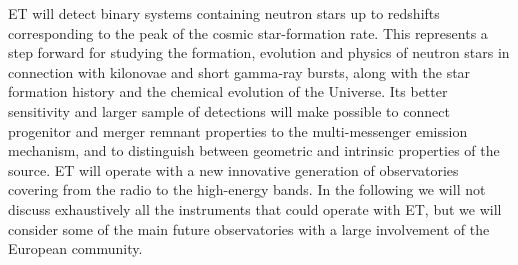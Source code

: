 ET will detect binary systems containing neutron stars up to redshifts corresponding to the peak of the cosmic star-formation rate. This represents a step forward for studying the formation, evolution and physics of neutron stars in connection with kilonovae and short gamma-ray bursts, along with the star formation history and the chemical evolution of the Universe. Its better  sensitivity and larger sample of detections will make possible to connect progenitor and merger remnant properties to the multi-messenger emission mechanism, and 
to distinguish between geometric and intrinsic properties of the source. ET will operate with a new innovative generation of observatories covering from the radio to the high-energy bands. In the following we will not discuss exhaustively all the instruments that could operate with ET, but we will consider some of the main future observatories with a large involvement of the European community.

